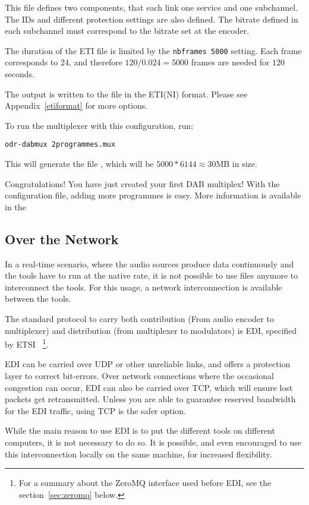 This file defines two components, that each link one service and one
subchannel. The IDs and different protection settings are also defined.
The bitrate defined in each subchannel must correspond to the bitrate set at
the encoder.

The duration of the ETI file is limited by the \lstinline{nbframes 5000}
setting. Each frame corresponds to $24$\ms, and therefore $120 / 0.024 = 5000$
frames are needed for $120$ seconds.

The output is written to the file  in the ETI(NI) format.
Please see Appendix~\ref{etiformat} for more options.

To run the multiplexer with this configuration, run:
\begin{lstlisting}
odr-dabmux 2programmes.mux
\end{lstlisting}

This will generate the file , which will be $5000 * 6144
\approx 30$\si{MB} in size.

Congratulations! You have just created your first DAB multiplex! With the
configuration file, adding more programmes is easy. More information is
available in the 

\subsection{Over the Network}
In a real-time scenario, where the audio sources produce data continuously and
the tools have to run at the native rate, it is not possible to use files
anymore to interconnect the tools. For this usage, a network interconnection is
available between the tools.

The standard protocol to carry both contribution (From audio encoder to
multiplexer) and distribution (from multiplexer to modulators) is
EDI, specified by ETSI~\cite{etsits102693}
\footnote{For a summary about the ZeroMQ interface used before EDI, see the
section~\ref{sec:zeromq} below.}.

EDI can be carried over UDP or other unreliable links, and offers a protection
layer to correct bit-errors. Over network connections where the occasional
congestion can occur, EDI can also be carried over TCP, which will ensure lost
packets get retransmitted. Unless you are able to guarantee reserved bandwidth
for the EDI traffic, using TCP is the safer option.

While the main reason to use EDI is to put the different tools on different
computers, it is not necessary to do so.
It is possible, and even encouraged to use this interconnection locally on the
same machine, for increased flexibility.

